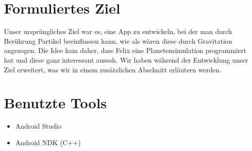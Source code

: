 \documentclass[8pt, letterpaper]{article}
\title{}
\author{Jakob Kirsch und Felix Warschburger}
\date{\parbox{\linewidth}{\centering%
  \today\endgraf\bigskip
  Fach: InVer\endgraf\medskip
  Betreuer: Herr Maier\endgraf\medskip
}}
\begin{document}
\maketitle
\newpage
\tableofcontents
\newpage

\section{Formuliertes Ziel}
Unser ursprüngliches Ziel war es, eine App zu entwickeln, bei der man durch Berührung Partikel beeinflussen kann, wie als wären diese durch Gravitation angezogen. Die Idee kam daher, dass Felix eine Planetensimulation programmiert hat und diese ganz interessant aussah. Wir haben während der Entwicklung unser Ziel erweitert, was wir in einem zusätzlichen Abschnitt erläutern werden.

\section{Benutzte Tools}
\begin{itemize}
    \item Android Studio
    \item Android NDK (C++)
\end{itemize}
\end{document}
